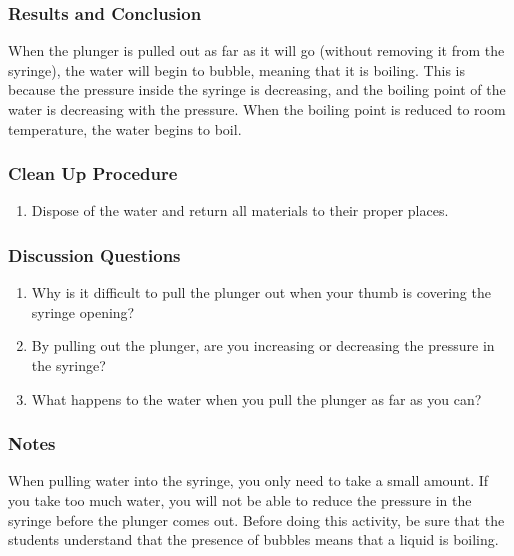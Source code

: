 \subsubsection*{Results and Conclusion}
When the plunger is pulled out as far as it will go (without removing it from the syringe), the water will begin to bubble, meaning that it is boiling. This is because the pressure inside the syringe is decreasing, and the boiling point of the water is decreasing with the pressure. When the boiling point is reduced to room temperature, the water begins to boil.  

\subsubsection*{Clean Up Procedure}
\begin{enumerate}
\item{Dispose of the water and return all materials to their proper places.} 
\end{enumerate}

\subsubsection*{Discussion Questions}
\begin{enumerate}
\item{Why is it difficult to pull the plunger out when your thumb is covering the syringe opening?}
\item{By pulling out the plunger, are you increasing or decreasing the pressure in the syringe?}
\item{What happens to the water when you pull the plunger as far as you can?}
\end{enumerate}

\subsubsection*{Notes}
When pulling water into the syringe, you only need to take a small amount. If you take too much water, you will not be able to reduce the pressure in the syringe before the plunger comes out.  
Before doing this activity, be sure that the students understand that the presence of bubbles means that a liquid is boiling.

